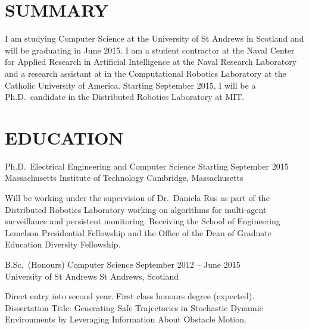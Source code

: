 \documentclass[line,margin]{cv}
\begin{document}
\address{Email: \href{mailto:wallar@mit.edu}{wallar@mit.edu}}
\address{Website: \href{http://aw204.host.cs.st-andrews.ac.uk}
{http://aw204.host.cs.st-andrews.ac.uk}}

\begin{resume}

\section{SUMMARY}

I am studying Computer Science at the University of St Andrews in Scotland and
will be graduating in June 2015. I am a student contractor at the Naval Center
for Applied Research in Artificial Intelligence at the Naval Research
Laboratory and a research assistant at in the Computational Robotics Laboratory
at the Catholic University of America. Starting September 2015, I will be a
Ph.D.\ candidate in the Distributed Robotics Laboratory at MIT.

\section{EDUCATION}

Ph.D.\ Electrical Engineering and Computer Science
\hfill Starting September 2015 \\
Massachusetts Institute of Technology \hfill Cambridge, Massachusetts
\begin{adjustwidth}{2.5em}{2.5em}

    Will be working under the supervision of Dr.\ Daniela Rus as part of the
    Distributed Robotics Laboratory working on algorithms for multi-agent
    surveillance and persistent monitoring. Receiving the School of Engineering
    Lemelson Presidential Fellowship and the Office of the Dean of Graduate
    Education Diversity Fellowship.

\end{adjustwidth}

B.Sc.\ (Honours) Computer Science
\hfill September 2012 -- June 2015 \\
University of St Andrews \hfill St Andrews, Scotland
\begin{adjustwidth}{2.5em}{2.5em}

    Direct entry into second year. First class honours degree (expected).\\
    Dissertation Title: Generating Safe Trajectories in Stochastic Dynamic
    Environments by Leveraging Information About Obstacle Motion.


\end{adjustwidth}
\end{resume}
\end{document}
